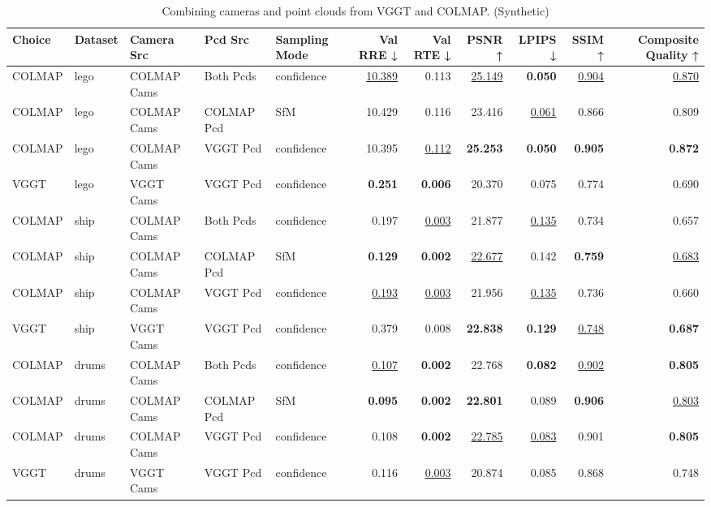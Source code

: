 \begin{table}[H]
\caption{\ifdefined\customcaption \customcaption \else Combining cameras and point clouds from VGGT and COLMAP. (Synthetic) \fi}
\label{tab:07_combined_single_brief_synthetic}
\centering
\tiny
\begin{tabular}{lllllrrrrrr}
\toprule
Choice & Dataset & Camera Src & Pcd Src & Sampling Mode & Val RRE ↓ & Val RTE ↓ & PSNR ↑ & LPIPS ↓ & SSIM ↑ & Composite Quality ↑ \\
\midrule
COLMAP & lego & COLMAP Cams & Both Pcds & confidence & \underline{10.389} & 0.113 & \underline{25.149} & \textbf{0.050} & \underline{0.904} & \underline{0.870} \\
COLMAP & lego & COLMAP Cams & COLMAP Pcd & SfM & 10.429 & 0.116 & 23.416 & \underline{0.061} & 0.866 & 0.809 \\
COLMAP & lego & COLMAP Cams & VGGT Pcd & confidence & 10.395 & \underline{0.112} & \textbf{25.253} & \textbf{0.050} & \textbf{0.905} & \textbf{0.872} \\
VGGT & lego & VGGT Cams & VGGT Pcd & confidence & \textbf{0.251} & \textbf{0.006} & 20.370 & 0.075 & 0.774 & 0.690 \\
\midrule
COLMAP & ship & COLMAP Cams & Both Pcds & confidence & 0.197 & \underline{0.003} & 21.877 & \underline{0.135} & 0.734 & 0.657 \\
COLMAP & ship & COLMAP Cams & COLMAP Pcd & SfM & \textbf{0.129} & \textbf{0.002} & \underline{22.677} & 0.142 & \textbf{0.759} & \underline{0.683} \\
COLMAP & ship & COLMAP Cams & VGGT Pcd & confidence & \underline{0.193} & \underline{0.003} & 21.956 & \underline{0.135} & 0.736 & 0.660 \\
VGGT & ship & VGGT Cams & VGGT Pcd & confidence & 0.379 & 0.008 & \textbf{22.838} & \textbf{0.129} & \underline{0.748} & \textbf{0.687} \\
\midrule
COLMAP & drums & COLMAP Cams & Both Pcds & confidence & \underline{0.107} & \textbf{0.002} & 22.768 & \textbf{0.082} & \underline{0.902} & \textbf{0.805} \\
COLMAP & drums & COLMAP Cams & COLMAP Pcd & SfM & \textbf{0.095} & \textbf{0.002} & \textbf{22.801} & 0.089 & \textbf{0.906} & \underline{0.803} \\
COLMAP & drums & COLMAP Cams & VGGT Pcd & confidence & 0.108 & \textbf{0.002} & \underline{22.785} & \underline{0.083} & 0.901 & \textbf{0.805} \\
VGGT & drums & VGGT Cams & VGGT Pcd & confidence & 0.116 & \underline{0.003} & 20.874 & 0.085 & 0.868 & 0.748 \\
\bottomrule
\end{tabular}
\end{table}